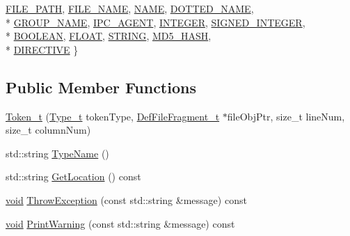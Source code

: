 \begin{DoxyCompactItemize}
\hyperlink{struct_token__t_a344cbfed08291bcbc163935eb646c601ae9c0f7370f821c9059fa94820a4b8042}{F\+I\+L\+E\+\_\+\+P\+A\+TH}, 
\hyperlink{struct_token__t_a344cbfed08291bcbc163935eb646c601ab1222735e6b22e702ca0252f25145c26}{F\+I\+L\+E\+\_\+\+N\+A\+ME}, 
\hyperlink{struct_token__t_a344cbfed08291bcbc163935eb646c601a61b52e0fc4c6bb880e10cee21997a580}{N\+A\+ME}, 
\hyperlink{struct_token__t_a344cbfed08291bcbc163935eb646c601a5d3d01d8e6d35cd0b3c1ef73152c5d1d}{D\+O\+T\+T\+E\+D\+\_\+\+N\+A\+ME}, 
\\*
\hyperlink{struct_token__t_a344cbfed08291bcbc163935eb646c601ad7fd04ee39395a7ec532ff068708ad70}{G\+R\+O\+U\+P\+\_\+\+N\+A\+ME}, 
\hyperlink{struct_token__t_a344cbfed08291bcbc163935eb646c601a73fd5a229804df7a5d9b3facd29671c2}{I\+P\+C\+\_\+\+A\+G\+E\+NT}, 
\hyperlink{struct_token__t_a344cbfed08291bcbc163935eb646c601a9f28c91e407a810fe8cea3d682745482}{I\+N\+T\+E\+G\+ER}, 
\hyperlink{struct_token__t_a344cbfed08291bcbc163935eb646c601a50fddbdc50a9d83a4f0551b29062f808}{S\+I\+G\+N\+E\+D\+\_\+\+I\+N\+T\+E\+G\+ER}, 
\\*
\hyperlink{struct_token__t_a344cbfed08291bcbc163935eb646c601a5e4005cfa39ec87de57151a8b5ce6e8e}{B\+O\+O\+L\+E\+AN}, 
\hyperlink{struct_token__t_a344cbfed08291bcbc163935eb646c601a610d79df8ca24b1ca17ec140ba54687f}{F\+L\+O\+AT}, 
\hyperlink{struct_token__t_a344cbfed08291bcbc163935eb646c601adbd0ec37fd6b471e27279d6d4d7bb01a}{S\+T\+R\+I\+NG}, 
\hyperlink{struct_token__t_a344cbfed08291bcbc163935eb646c601a06ca7c540bb04f930bf091b2ab2a3420}{M\+D5\+\_\+\+H\+A\+SH}, 
\\*
\hyperlink{struct_token__t_a344cbfed08291bcbc163935eb646c601abc6939a9995aabbf5bb4f8137f121789}{D\+I\+R\+E\+C\+T\+I\+VE}
 \}
\end{DoxyCompactItemize}
\subsection*{Public Member Functions}
\begin{DoxyCompactItemize}
\item 
\hyperlink{struct_token__t_a604ff7f0b313580368a5674abfedf15b}{Token\+\_\+t} (\hyperlink{struct_token__t_a344cbfed08291bcbc163935eb646c601}{Type\+\_\+t} token\+Type, \hyperlink{struct_def_file_fragment__t}{Def\+File\+Fragment\+\_\+t} $\ast$file\+Obj\+Ptr, size\+\_\+t line\+Num, size\+\_\+t column\+Num)
\item 
std\+::string \hyperlink{struct_token__t_aa2c04546154d2d1279b9b52ec4df6650}{Type\+Name} ()
\item 
std\+::string \hyperlink{struct_token__t_a998f6d8add5baadaeab53ba21c0d296f}{Get\+Location} () const 
\item 
\hyperlink{_t_e_m_p_l_a_t_e__cdef_8h_ac9c84fa68bbad002983e35ce3663c686}{void} \hyperlink{struct_token__t_acf807a7daff40fbe48148ad9cd045d18}{Throw\+Exception} (const std\+::string \&message) const 
\item 
\hyperlink{_t_e_m_p_l_a_t_e__cdef_8h_ac9c84fa68bbad002983e35ce3663c686}{void} \hyperlink{struct_token__t_aff24cc8b11d69fc40c6d1202b8ec6a01}{Print\+Warning} (const std\+::string \&message) const 
\end{DoxyCompactItemize}
